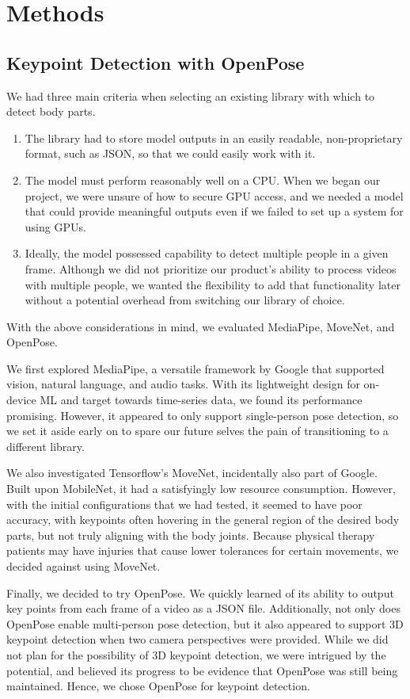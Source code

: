 \section{Methods}
\subsection{Keypoint Detection with OpenPose}
We had three main criteria when selecting an existing library with which to detect body parts.
\begin{enumerate}
    \item The library had to store model outputs in an easily readable, non-proprietary format, such as JSON, 
    so that we could easily work with it.
    \item The model must perform reasonably well on a CPU. When we began our project, we were unsure of how 
    to secure GPU access, and we needed a model that could provide meaningful outputs even if we failed to 
    set up a system for using GPUs.
    \item Ideally, the model possessed capability to detect multiple people in a given frame. Although we did 
    not prioritize our product’s ability to process videos with multiple people, we wanted the flexibility to 
    add that functionality later without a potential overhead from switching our library of choice.
\end{enumerate}
With the above considerations in mind, we evaluated MediaPipe, MoveNet, and OpenPose.

We first explored MediaPipe, a versatile framework by Google that supported vision, natural language, and audio 
tasks. With its lightweight design for on-device ML and target towards time-series data, we found its performance 
promising. However, it appeared to only support single-person pose detection, so we set it aside early on to 
spare our future selves the pain of transitioning to a different library.
	
We also investigated Tensorflow’s MoveNet, incidentally also part of Google. Built upon MobileNet, it had a 
satisfyingly low resource consumption. However, with the initial configurations that we had tested, it seemed to 
have poor accuracy, with keypoints often hovering in the general region of the desired body parts, but not truly 
aligning with the body joints. Because physical therapy patients may have injuries that cause lower tolerances 
for certain movements, we decided against using MoveNet.
	
Finally, we decided to try OpenPose. We quickly learned of its ability to output key points from each frame of a 
video as a JSON file. Additionally, not only does OpenPose enable multi-person pose detection, but it also appeared 
to support 3D keypoint detection when two camera perspectives were provided. While we did not plan for the possibility 
of 3D keypoint detection, we were intrigued by the potential, and believed its progress to be evidence that OpenPose 
was still being maintained. Hence, we chose OpenPose for keypoint detection.
	
